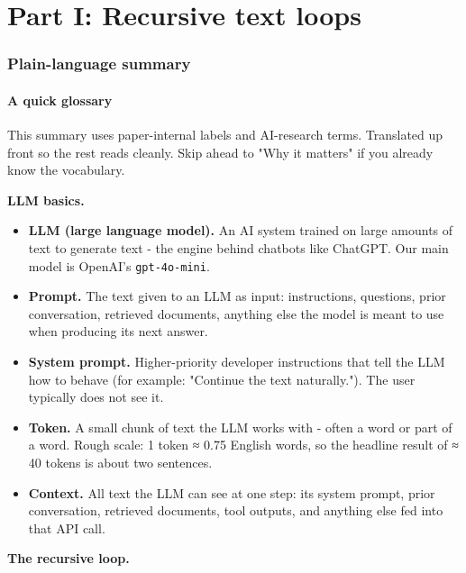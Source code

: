 \documentclass{article}
\theoremstyle{plain}
\theoremstyle{definition}
\begin{document}
\part*{Part I: Recursive text loops}



\section*{Plain-language summary}

\subsection*{A quick glossary}

This summary uses paper-internal labels and AI-research terms.
Translated up front so the rest reads cleanly. Skip ahead to "Why it
matters" if you already know the vocabulary.

\textbf{LLM basics.}

\begin{itemize}
  \item \textbf{LLM (large language model).} An AI system trained on large
  amounts of text to generate text - the engine behind chatbots like
  ChatGPT. Our main model is OpenAI's \texttt{gpt-4o-mini}.
  \item \textbf{Prompt.} The text given to an LLM as input: instructions,
  questions, prior conversation, retrieved documents, anything else
  the model is meant to use when producing its next answer.
  \item \textbf{System prompt.} Higher-priority developer instructions that
  tell the LLM how to behave (for example: "Continue the text
  naturally."). The user typically does not see it.
  \item \textbf{Token.} A small chunk of text the LLM works with - often a word
  or part of a word. Rough scale: 1 token ≈ 0.75 English words, so
  the headline result of ≈ 40 tokens is about two sentences.
  \item \textbf{Context.} All text the LLM can see at one step: its system
  prompt, prior conversation, retrieved documents, tool outputs, and
  anything else fed into that API call.
\end{itemize}

\textbf{The recursive loop.}
\end{document}
